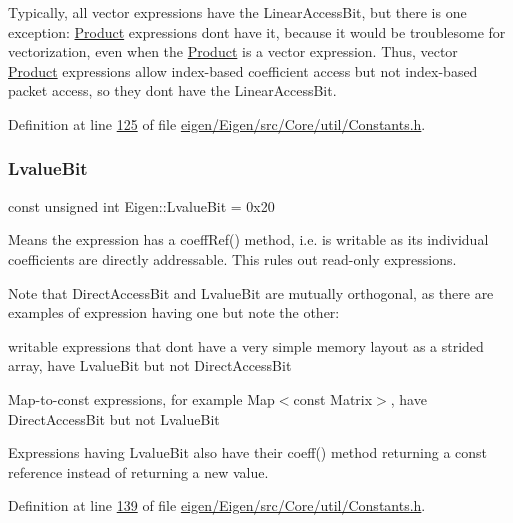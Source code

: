Typically, all vector expressions have the Linear\+Access\+Bit, but there is one exception\+: \hyperlink{group___core___module_class_eigen_1_1_product}{Product} expressions don\textquotesingle{}t have it, because it would be troublesome for vectorization, even when the \hyperlink{group___core___module_class_eigen_1_1_product}{Product} is a vector expression. Thus, vector \hyperlink{group___core___module_class_eigen_1_1_product}{Product} expressions allow index-\/based coefficient access but not index-\/based packet access, so they don\textquotesingle{}t have the Linear\+Access\+Bit. 

Definition at line \hyperlink{eigen_2_eigen_2src_2_core_2util_2_constants_8h_source_l00125}{125} of file \hyperlink{eigen_2_eigen_2src_2_core_2util_2_constants_8h_source}{eigen/\+Eigen/src/\+Core/util/\+Constants.\+h}.

\mbox{\label{group__flags_gae2c323957f20dfdc6cb8f44428eaec1a}} 
\subsubsection{\texorpdfstring{Lvalue\+Bit}{LvalueBit}}
{\footnotesize\ttfamily const unsigned int Eigen\+::\+Lvalue\+Bit = 0x20}

Means the expression has a coeff\+Ref() method, i.\+e. is writable as its individual coefficients are directly addressable. This rules out read-\/only expressions.

Note that Direct\+Access\+Bit and Lvalue\+Bit are mutually orthogonal, as there are examples of expression having one but note the other\+: \begin{DoxyItemize}
\item writable expressions that don\textquotesingle{}t have a very simple memory layout as a strided array, have Lvalue\+Bit but not Direct\+Access\+Bit \item Map-\/to-\/const expressions, for example Map$<$const Matrix$>$, have Direct\+Access\+Bit but not Lvalue\+Bit\end{DoxyItemize}
Expressions having Lvalue\+Bit also have their coeff() method returning a const reference instead of returning a new value. 

Definition at line \hyperlink{eigen_2_eigen_2src_2_core_2util_2_constants_8h_source_l00139}{139} of file \hyperlink{eigen_2_eigen_2src_2_core_2util_2_constants_8h_source}{eigen/\+Eigen/src/\+Core/util/\+Constants.\+h}.

